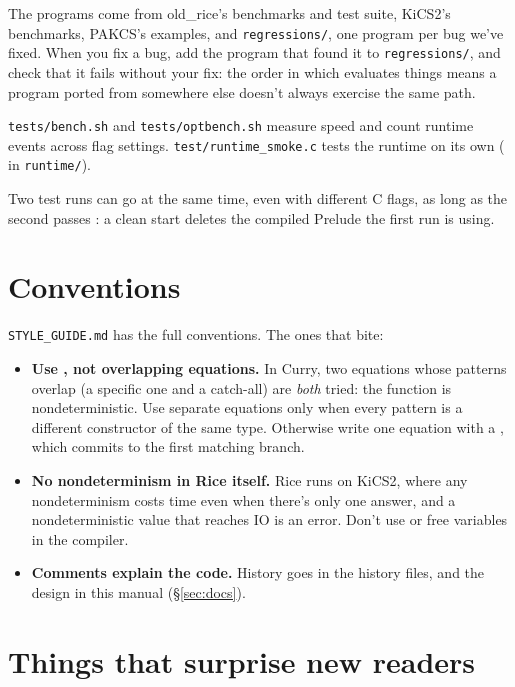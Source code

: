 \documentclass[11pt]{article}
\newcommand{\code}[1]{\texttt{\detokenize{#1}}}
\newcommand{\file}[1]{\nolinkurl{#1}}
\begin{document}
The programs come from old\_rice's benchmarks and test suite, KiCS2's
benchmarks, PAKCS's examples, and \file{regressions/}, one program per bug
we've fixed.  When you fix a bug, add the program that found it to
\file{regressions/}, and check that it fails without your fix: the order in
which \code{nf} evaluates things means a program ported from somewhere else
doesn't always exercise the same path.

\file{tests/bench.sh} and \file{tests/optbench.sh} measure speed and count
runtime events across flag settings.  \file{test/runtime_smoke.c} tests the
runtime on its own (\code{make test} in \file{runtime/}).

Two test runs can go at the same time, even with different C flags, as long
as the second passes \code{--no-clean}: a clean start deletes the compiled
Prelude the first run is using.

\section{Conventions}

\file{STYLE_GUIDE.md} has the full conventions.  The ones that bite:
\begin{itemize}
  \item \textbf{Use \code{case}, not overlapping equations.}  In Curry, two
    equations whose patterns overlap (a specific one and a catch-all) are
    \emph{both} tried: the function is nondeterministic.  Use separate equations
    only when every pattern is a different constructor of the same type.
    Otherwise write one equation with a \code{case}, which commits to the first
    matching branch.
  \item \textbf{No nondeterminism in Rice itself.}  Rice runs on KiCS2, where
    any nondeterminism costs time even when there's only one answer, and a
    nondeterministic value that reaches IO is an error.  Don't use \code{?} or
    free variables in the compiler.
  \item \textbf{Comments explain the code.}  History goes in the history files,
    and the design in this manual (\S\ref{sec:docs}).
\end{itemize}

\section{Things that surprise new readers}
\end{document}
